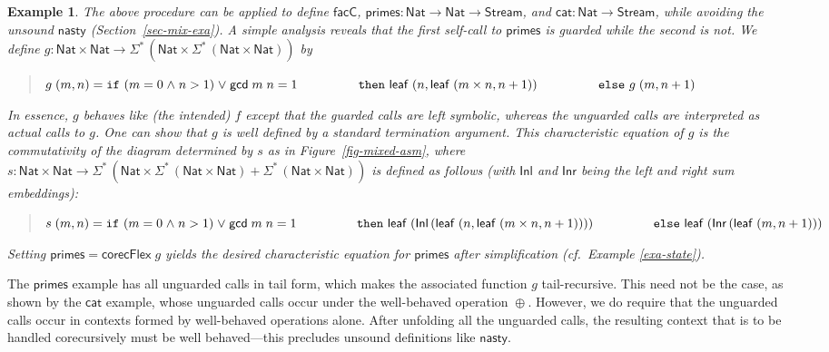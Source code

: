 \documentclass[preprint,draft]
{sigplanconf}
\newcommand\TC{\mathsf}
\newcommand\keyw[1]{\texttt{#1}}
\newtheorem{eexample}[theorem]{Example}
\newcommand{\ra}{\rightarrow}
\newcommand{\<}{\langle}
\renewcommand{\>}{\rangle}
\renewcommand{\eta}{{{\mathsf{leaf}}}}
\newcommand{\evil}{{{\mathsf{nasty}}}}
\newcommand\corecUU{\mathsf{corecFlex}}
\newcommand{\opls}{\mathrel\oplus}
\newcommand{\primes}{{{\mathsf{primes}}}}
\newcommand{\GCD}{{{\mathsf{gcd}}}}
\newcommand{\facC}{{{\mathsf{facC}}}}
\newcommand{\catalan}{{{\mathsf{cat}}}}
\renewcommand{\SS}{{\TC{\Sigma}}}
\newcommand{\Inl}{\mathsf{{Inl}}}
\newcommand{\Inr}{\mathsf{{Inr}}}
\newcommand\Stream{\TC{Stream}}
\newcommand\Nat{{\TC{Nat}}}
\def\S{Section~}
\begin{document}
\begin{eexample}\rm \label{exa-mixed}
The above procedure can be applied to define $\facC$,
$\primes : \Nat \ra \Nat \ra \Stream$, and $\catalan : \Nat \ra \Stream$,
while avoiding the unsound $\evil$ (\S\ref{sec-mix-exa}).
A simple analysis reveals that
the first self-call to $\primes$ is guarded while the second is not.
We define
$g : \Nat \times \Nat \ra \SS^*\,(\Nat \times \SS^*\,(\Nat \times \Nat))$ by
\begin{quote}
$g\;(m,n)  =  \keyw{if}~(m = 0 \mathrel\land n > 1) \mathrel\lor \GCD\;m\;n = 1\\
\phantom{g\;(m,n)  = {}} \keyw{then}~\eta\;(n, \eta\;(m \times n, n+1))\\
\phantom{g\;(m,n)  =  {}} \keyw{else}~g\;(m,n+1)$
\end{quote}
In essence, $g$ behaves like (the intended) $f$ except that the guarded calls are left
symbolic, whereas the unguarded calls are interpreted as actual calls to $g$.
One can show that $g$ is well defined by a standard termination argument.
This characteristic equation of $g$
is the commutativity of the diagram
determined by $s$ as in Figure~\ref{fig-mixed-asm},
where $s :  \Nat \times \Nat \ra \SS^*\,(\Nat \times \SS^*\,(\Nat \times \Nat) \mathrel+ \SS^*\,(\Nat \times \Nat))$ is
defined as follows
(with $\Inl$ and $\Inr$ being the left and right sum embeddings):
\begin{quote}
$s\;(m,n)  =  \keyw{if}~(m = 0 \mathrel\land n > 1) \mathrel\lor \GCD\;m\;n = 1\\
\phantom{s\;(m,n)  =  {}} \keyw{then}~\eta\;(\Inl\,(\eta\;(n, \eta\;(m \times n, n+1))))\\
\phantom{s\;(m,n)  =  {}} \keyw{else}~\eta\;(\Inr\,(\eta\;(m,n+1)))$
\end{quote}
Setting $\primes = \corecUU\;g$ yields the desired characteristic equation for
$\primes$
after simplification (cf.\ Example \ref{exa-state}).
\end{eexample}

The $\primes$ example has all unguarded calls in tail form, which makes the associated function $g$
tail-recursive. This need not be the case, as shown by the $\catalan$ example,
whose unguarded calls occur under
the well-behaved operation $\opls$. However, we do require that the unguarded calls occur in contexts formed by
well-behaved operations alone. After unfolding all the unguarded calls,
the resulting context that is to be handled corecursively
must be well behaved---this precludes unsound definitions like
$\evil$. 
\end{document}
